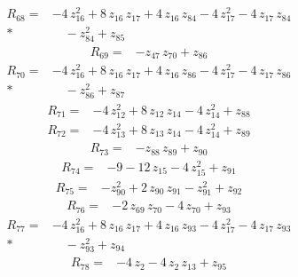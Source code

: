 \documentclass[10pt]{article}
\begin{document}
\begin{align*}
R_{68}={}& - 4\,z_{16}^{2} + 8\,z_{16}\,z_{17} + 4\,z_{16}\,z_{84} - 4\,z_{17}^{2} - 4\,z_{17}\,z_{84} \\*
&\quad - z_{84}^{2} + z_{85}
\end{align*}
\begin{align*}
R_{69}={}& - z_{47}\,z_{70} + z_{86}
\end{align*}
\begin{align*}
R_{70}={}& - 4\,z_{16}^{2} + 8\,z_{16}\,z_{17} + 4\,z_{16}\,z_{86} - 4\,z_{17}^{2} - 4\,z_{17}\,z_{86} \\*
&\quad - z_{86}^{2} + z_{87}
\end{align*}
\begin{align*}
R_{71}={}& - 4\,z_{12}^{2} + 8\,z_{12}\,z_{14} - 4\,z_{14}^{2} + z_{88}
\end{align*}
\begin{align*}
R_{72}={}& - 4\,z_{13}^{2} + 8\,z_{13}\,z_{14} - 4\,z_{14}^{2} + z_{89}
\end{align*}
\begin{align*}
R_{73}={}& - z_{88}\,z_{89} + z_{90}
\end{align*}
\begin{align*}
R_{74}={}& - 9 - 12\,z_{15} - 4\,z_{15}^{2} + z_{91}
\end{align*}
\begin{align*}
R_{75}={}& - z_{90}^{2} + 2\,z_{90}\,z_{91} - z_{91}^{2} + z_{92}
\end{align*}
\begin{align*}
R_{76}={}& - 2\,z_{69}\,z_{70} - 4\,z_{70} + z_{93}
\end{align*}
\begin{align*}
R_{77}={}& - 4\,z_{16}^{2} + 8\,z_{16}\,z_{17} + 4\,z_{16}\,z_{93} - 4\,z_{17}^{2} - 4\,z_{17}\,z_{93} \\*
&\quad - z_{93}^{2} + z_{94}
\end{align*}
\begin{align*}
R_{78}={}& - 4\,z_{2} - 4\,z_{2}\,z_{13} + z_{95}
\end{align*}
\end{document}
